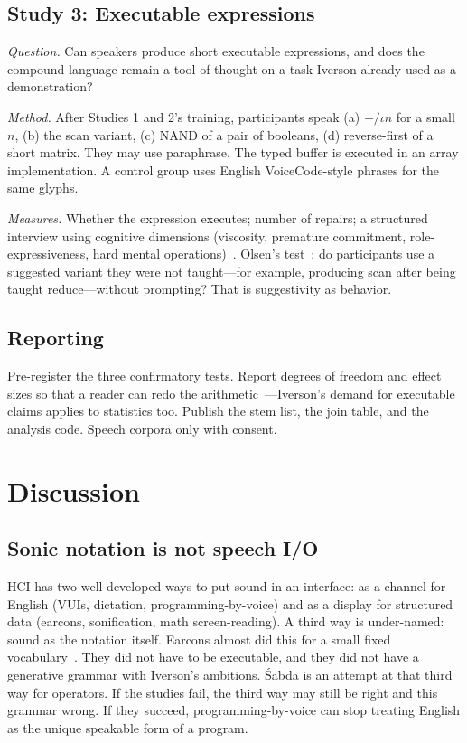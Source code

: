 \documentclass[manuscript, review, anonymous]{acmart}
\begin{document}
\subsection{Study 3: Executable expressions}

\textit{Question.} Can speakers produce short executable expressions, and does the compound language remain a tool of thought on a task Iverson already used as a demonstration?

\textit{Method.} After Studies 1 and 2's training, participants speak (a) $+/\iota n$ for a small $n$, (b) the scan variant, (c) NAND of a pair of booleans, (d) reverse-first of a short matrix. They may use paraphrase. The typed buffer is executed in an array implementation. A control group uses English VoiceCode-style phrases for the same glyphs.

\textit{Measures.} Whether the expression executes; number of repairs; a structured interview using cognitive dimensions (viscosity, premature commitment, role-expressiveness, hard mental operations)~\cite{Green1996Cognitive}. Olsen's test~\cite{Olsen2007UIST}: do participants use a suggested variant they were not taught---for example, producing scan after being taught reduce---without prompting? That is suggestivity as behavior.

\subsection{Reporting}

Pre-register the three confirmatory tests. Report degrees of freedom and effect sizes so that a reader can redo the arithmetic~\cite{Iverson1980Notation}---Iverson's demand for executable claims applies to statistics too. Publish the stem list, the join table, and the analysis code. Speech corpora only with consent.

\section{Discussion}
\label{sec:discussion}

\subsection{Sonic notation is not speech I/O}

HCI has two well-developed ways to put sound in an interface: as a channel for English (VUIs, dictation, programming-by-voice) and as a display for structured data (earcons, sonification, math screen-reading). A third way is under-named: sound as the notation itself. Earcons almost did this for a small fixed vocabulary~\cite{Blattner1989Earcons}. They did not have to be executable, and they did not have a generative grammar with Iverson's ambitions. {\'S}abda is an attempt at that third way for operators. If the studies fail, the third way may still be right and this grammar wrong. If they succeed, programming-by-voice can stop treating English as the unique speakable form of a program.
\end{document}
